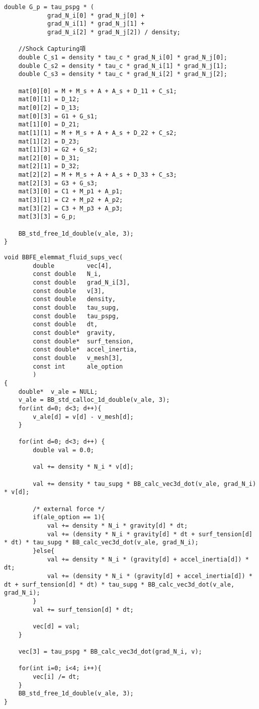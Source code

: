 \begin{lstlisting}[caption = fluid\_element.cの係数行列の計算]
	double G_p = tau_pspg * (
			grad_N_i[0] * grad_N_j[0] +
			grad_N_i[1] * grad_N_j[1] +
			grad_N_i[2] * grad_N_j[2]) / density;

	//Shock Capturing項
	double C_s1 = density * tau_c * grad_N_i[0] * grad_N_j[0];
	double C_s2 = density * tau_c * grad_N_i[1] * grad_N_j[1];
	double C_s3 = density * tau_c * grad_N_i[2] * grad_N_j[2];

	mat[0][0] = M + M_s + A + A_s + D_11 + C_s1;
	mat[0][1] = D_12;
	mat[0][2] = D_13;
	mat[0][3] = G1 + G_s1;
	mat[1][0] = D_21;
	mat[1][1] = M + M_s + A + A_s + D_22 + C_s2;
	mat[1][2] = D_23;
	mat[1][3] = G2 + G_s2;
	mat[2][0] = D_31;
	mat[2][1] = D_32;
	mat[2][2] = M + M_s + A + A_s + D_33 + C_s3;
	mat[2][3] = G3 + G_s3;
	mat[3][0] = C1 + M_p1 + A_p1;
	mat[3][1] = C2 + M_p2 + A_p2;
	mat[3][2] = C3 + M_p3 + A_p3;
	mat[3][3] = G_p;

	BB_std_free_1d_double(v_ale, 3);
}

\end{lstlisting}

\begin{lstlisting}[caption = fluid\_element.cの右辺ベクトルの計算]
void BBFE_elemmat_fluid_sups_vec(
		double         vec[4],
		const double   N_i,
		const double   grad_N_i[3],
		const double   v[3],
		const double   density,
		const double   tau_supg,
		const double   tau_pspg,
		const double   dt,
		const double*  gravity,
		const double*  surf_tension,
		const double*  accel_inertia,
		const double   v_mesh[3],
		const int      ale_option
		)
{
	double*  v_ale = NULL;
	v_ale = BB_std_calloc_1d_double(v_ale, 3);
	for(int d=0; d<3; d++){
		v_ale[d] = v[d] - v_mesh[d];
	}

	for(int d=0; d<3; d++) {
		double val = 0.0;

		val += density * N_i * v[d];

		val += density * tau_supg * BB_calc_vec3d_dot(v_ale, grad_N_i) * v[d];

		/* external force */
		if(ale_option == 1){
			val += density * N_i * gravity[d] * dt;
			val += (density * N_i * gravity[d] * dt + surf_tension[d] * dt) * tau_supg * BB_calc_vec3d_dot(v_ale, grad_N_i);
		}else{
			val += density * N_i * (gravity[d] + accel_inertia[d]) * dt;
			val += (density * N_i * (gravity[d] + accel_inertia[d]) * dt + surf_tension[d] * dt) * tau_supg * BB_calc_vec3d_dot(v_ale, grad_N_i);
		}
		val += surf_tension[d] * dt;

		vec[d] = val;
	}

	vec[3] = tau_pspg * BB_calc_vec3d_dot(grad_N_i, v);

	for(int i=0; i<4; i++){
		vec[i] /= dt;
	}
	BB_std_free_1d_double(v_ale, 3);
}
\end{lstlisting}

